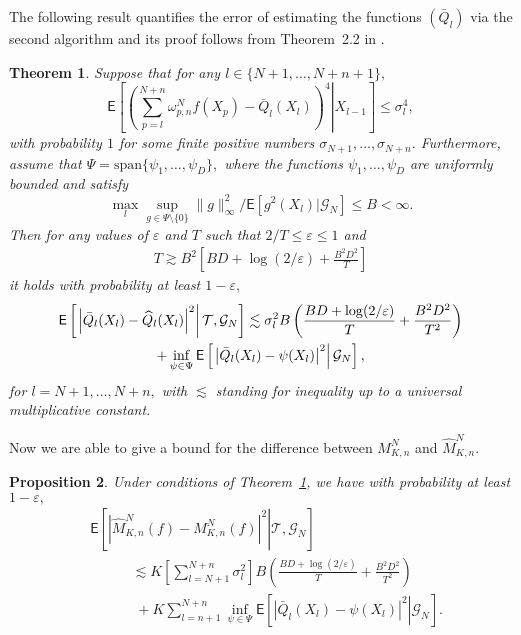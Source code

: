 \documentclass[aap,preprint]{imsart}
\def\NtrainPath{T}
\def\TrainSet{\mathcal{T}}
\newtheorem{thm}{Theorem}
\newtheorem{prop}[thm]{Proposition}
\begin{document}
The following result quantifies the error of estimating the functions \((\bar Q_l)\)
via the second algorithm and its proof follows from Theorem~2.2 in \cite{audibert2011robust}.
\begin{thm}\label{berm:theorem:regression_cv}
 Suppose that for any \(l\in \{N+1,\ldots,N+n+1\},\)
\[
\mathsf{E}\left[\left.\left(\sum_{p=l}^{N+n}\omega_{p,n}^{N}f(X_{p})-\bar Q_l(X_l)\right)^4\right | X_{l-1}\right]\leq \sigma_l^4,
\]
with probability \(1\) for some finite positive numbers \(\sigma_{N+1},\ldots, \sigma_{N+n}. \)
Furthermore, assume that \(\Psi=\mathrm{span}\{\psi_1,\ldots,\psi_D\},\) where the functions  \(\psi_1,\ldots,\psi_D\) are uniformly bounded and satisfy
\[
\max_{l}\sup_{g\in \Psi\setminus \{0\}} \|g\|^2_\infty/\mathsf{E}[g^2(X_l) | \mathcal{G}_N]\leq B<\infty.
\]
Then for any values of \(\varepsilon\) and \(\NtrainPath\) such that \(2/\NtrainPath\leq \varepsilon\leq 1\) and
\begin{eqnarray*}
\NtrainPath\gtrsim B^2\left[BD+\log(2/\varepsilon)+\frac{B^2D^2}{\NtrainPath}\right]
\end{eqnarray*}
it holds with probability at least \(1-\varepsilon,\)
\begin{multline}
\mathsf{E}\left[ \left.\Bigl|\bar Q_l(X_l)
-\widehat Q_l(X_l)\Bigr|^2\right | \TrainSet, \mathcal{G}_N\right]
\lesssim  \sigma^2_l B
\left(\frac{BD+\log(2/\varepsilon)}{\NtrainPath}+\frac{B^2D^2}{\NtrainPath^2}\right)
\\
 +
\inf_{\psi\in \Psi}
\mathsf{E}\left[\left.\left|\bar Q_l(X_{l})-\psi(X_{l})\right|^{2}\right | \mathcal{G}_N \right], \label{eq:regr_error}
\end{multline}
for \(l=N+1,\ldots,N+n,
\) with \(\lesssim\) standing for inequality up to a universal multiplicative constant.
\end{thm}
Now we are able to give  a bound for the difference between \( M_{K,n}^N\) and \(\widehat M_{K,n}^N.\)
\begin{prop}
\label{cor:dif_m}
Under  conditions of Theorem~\ref{berm:theorem:regression_cv}, we have with probability at least \(1-\varepsilon,\)
\begin{align}
\label{eq:main_bound}
&\mathsf{E}\left[\left.\left|\widehat{M}_{K,n}^{N}(f)-M_{K,n}^{N}(f)\right|^{2}\right | \TrainSet,\mathcal{G}_N\right] \\
\nonumber 
&\phantom{\mathsf{E}\widehat{M}_{K,n}^{N}}  \lesssim K\left[\sum_{l=N+1}^{N+n} \sigma^2_l \right]
B
\left(\frac{BD+\log(2/\varepsilon)}{\NtrainPath}+\frac{B^2D^2}{\NtrainPath^2}\right)
\\ \nonumber
& \phantom{\mathsf{E}|\widehat{M}_{K,n}^{N}} + K \sum_{l=n+1}^{N+n}\inf_{\psi\in \Psi}
\mathsf{E}\left[\left.\left|\bar Q_l(X_{l})-\psi(X_{l})\right|^{2}\right | \mathcal{G}_N \right].
\end{align}
\end{prop}
\end{document}
